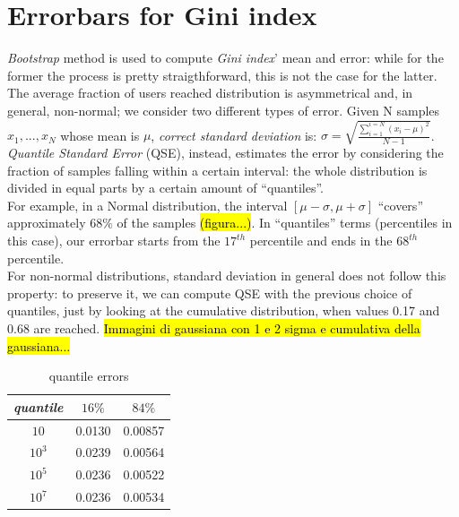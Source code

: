 \appendix
\section{Errorbars for Gini index}

\textit{Bootstrap} method\cite{bootstrap} is used to compute
\textit{Gini index}' mean and error: while for the former the process
is pretty straigthforward, this is not the case for the latter.
The average fraction of users reached distribution is asymmetrical and, in general,
non-normal; we consider two different types of error.
Given N samples ${x_1,...,x_N}$ whose mean is $\mu$,
\textit{correct standard deviation} is:
$\sigma=\sqrt{\frac{\sum_{i=1}^{i=N}(x_i - \mu)^2}{N-1}}$.\\
\textit{Quantile Standard Error} (QSE)\cite{quantile}, instead,
estimates the error by considering the fraction of samples
falling within a certain interval: the whole distribution is
divided in equal parts by a certain amount of ``quantiles''.\\
For example, in a Normal distribution, the interval
$[\mu -\sigma, \mu +\sigma]$ ``covers'' approximately $68\%$
of the samples \hl{(figura...)}.
In ``quantiles'' terms (percentiles in this case), our errorbar
starts from the $17^{th}$ percentile and ends in the $68^{th}$
percentile.\\
For non-normal distributions, standard deviation in general does
not follow this property: to preserve it, we can compute QSE with
the previous choice of quantiles, just by looking at the cumulative
distribution, when values 0.17 and 0.68 are reached.
\hl{Immagini di gaussiana con 1 e 2 sigma e cumulativa della gaussiana...}
\begin{table}[htpb]
  \centering
  \begin{tabular}{ccc}
    \toprule
    \textit{quantile} & $16\%$ & $84\%$ \\
    \midrule
    $10$   & 0.0130 & 0.00857 \\
    $10^3$ & 0.0239 & 0.00564 \\
    $10^5$ & 0.0236 & 0.00522 \\
    $10^7$ & 0.0236 & 0.00534 \\
    \bottomrule
  \end{tabular}
  \caption{quantile errors}
  \label{tab:quantile}
\end{table}
